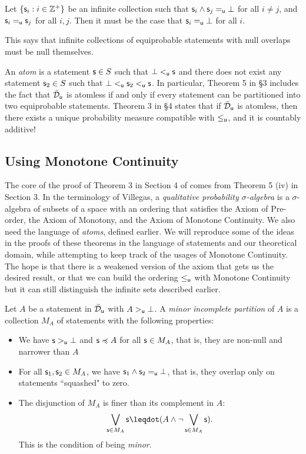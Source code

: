 \documentclass[11pt]{article}
\begin{document}
\begin{prop}
\label{infinitenull}
Let $\{\stmt_i : i\in \mathbb{Z}^+\}$ be an infinite collection such that $\stmt_i\AND\stmt_j =_{\stmt[u]} \impossibility$ for all $i\neq j$, and $\stmt_i =_{\stmt[u]} \stmt_j$ for all $i,j$. Then it must be the case that $\stmt_i=_{\stmt[u]}\impossibility$ for all $i$. 
\end{prop}
This says that infinite collections of equiprobable statements with null overlaps must be null themselves. 

An \emph{atom} is a statement $\stmt\in S$ such that $\impossibility<_{\stmt[u]}\stmt$ and there does not exist any statement $\stmt_2\in S$ such that $\impossibility<_{\stmt[u]} \stmt_2<_{\stmt[u]} \stmt$. In particular, Theorem 5 in \cite{villegas} \S3 includes the fact that $\tdomain_{\stmt[u]}$ is atomless if and only if every statement can be partitioned into two equiprobable statements. Theorem 3 in \S4 states that if $\tdomain_{\stmt[u]}$ is atomless, then there exists a unique probability measure compatible with $\leq_{\stmt[u]}$, and it is countably additive!

\subsection{Using Monotone Continuity}

The core of the proof of Theorem 3 in Section 4 of \cite{villegas} comes from Theorem 5 (iv) in Section 3. In the terminology of Villegas, a \emph{qualitative probability $\sigma$-algebra} is a $\sigma$-algebra of subsets of a space with an ordering that satisfies the Axiom of Pre-order, the Axiom of Monotony, and the Axiom of Monotone Continuity. We also need the language of \emph{atoms}, defined earlier. We will reproduce some of the ideas in the proofs of these theorems in the language of statements and our theoretical domain, while attempting to keep track of the usages of Monotone Continuity. The hope is that there is a weakened version of the axiom that gets us the desired result, or that we can build the ordering $\leq_{\stmt[u]}$ with Monotone Continuity but it can still distinguish the infinite sets described earlier. 

Let $A$ be a statement in $\tdomain_{\stmt[u]}$ with $A>_{\stmt[u]} \impossibility$. A \emph{minor incomplete partition} of $A$ is a collection $M_A$ of statements with the following properties:
\begin{itemize}
    \item We have $\stmt>_{\stmt[u]}\impossibility$ and $\stmt \narrower A$ for all $\stmt\in M_A$, that is, they are non-null and narrower than $A$
    \item For all $\stmt_1,\stmt_2\in M_A$, we have $\stmt_1\AND\stmt_2 =_{\stmt[u]} \impossibility$, that is, they overlap only on statements ``squashed" to zero. 
    \item The disjunction of $M_A$ is finer than its complement in $A$: $$\bigOR_{\stmt\in M_A}\stmt \finer (A\AND \NOT\bigOR_{\stmt\in M_A}\stmt).$$ This is the condition of being \emph{minor}.
\end{itemize}
\end{document}
